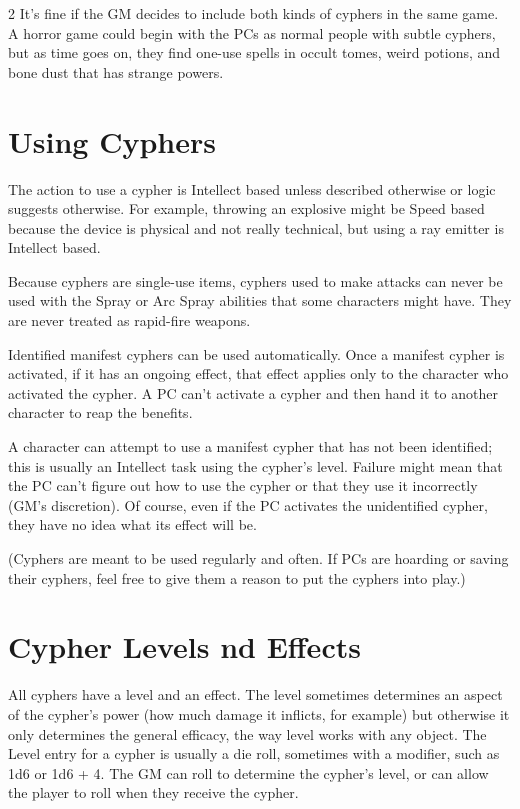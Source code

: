 \begin{multicols}{2}
It’s fine if the GM decides to include both kinds of cyphers in the same game. A horror game could begin with the PCs as normal people with subtle cyphers, but as time goes on, they find one-use spells in occult tomes, weird potions, and bone dust that has strange powers.

\section{Using Cyphers}

The action to use a cypher is Intellect based unless described otherwise or logic suggests otherwise. For example, throwing an explosive might be Speed based because the device is physical and not really technical, but using a ray emitter is Intellect based.

Because cyphers are single-use items, cyphers used to make attacks can never be used with the Spray or Arc Spray abilities that some characters might have. They are never treated as rapid-fire weapons.

Identified manifest cyphers can be used automatically. Once a manifest cypher is activated, if it has an ongoing effect, that effect applies only to the character who activated the cypher. A PC can’t activate a cypher and then hand it to another character to reap the benefits.

A character can attempt to use a manifest cypher that has not been identified; this is usually an Intellect task using the cypher’s level. Failure might mean that the PC can’t figure out how to use the cypher or that they use it incorrectly (GM’s discretion). Of course, even if the PC activates the unidentified cypher, they have no idea what its effect will be.

(Cyphers are meant to be used regularly and often. If PCs are hoarding or saving their cyphers, feel free to give them a reason to put the cyphers into play.)

\section{Cypher Levels nd Effects}

All cyphers have a level and an effect. The level sometimes determines an aspect of the cypher’s power (how much damage it inflicts, for example) but otherwise it only determines the general efficacy, the way level works with any object. The Level entry for a cypher is usually a die roll, sometimes with a modifier, such as 1d6 or 1d6 + 4. The GM can roll to determine the cypher’s level, or can allow the player to roll when they receive the cypher.


\end{multicols}

